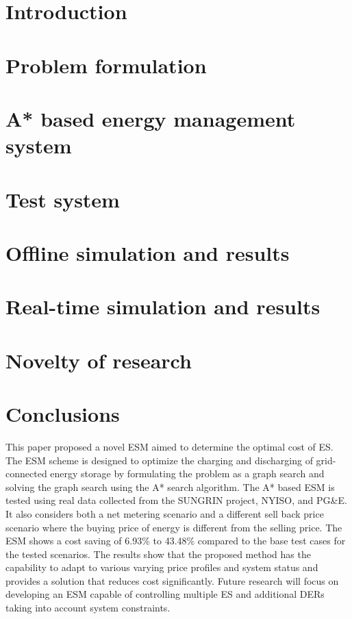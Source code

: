 \documentclass[journal]{IEEEtran}
\begin{document}
\IEEEpeerreviewmaketitle


\section{Introduction}


\section{Problem formulation} \label{formulation}


\section{A* based energy management system} \label{A*}


\section{Test system} \label{sys}


\section{Offline simulation and results} \label{OFF}


\section{Real-time simulation and results} \label{RT}


\section{Novelty of research} \label{Novelty}


\section{Conclusions}
This paper proposed a novel ESM aimed to determine the optimal cost of ES. The ESM scheme is designed to optimize the charging and discharging of grid-connected energy storage by formulating the problem as a graph search and solving the graph search using the A* search algorithm. The A* based ESM is tested using real data collected from the SUNGRIN project, NYISO, and PG\&E. It also considers both a net metering scenario and a different sell back price scenario where the buying price of energy is different from the selling price. The ESM shows a cost saving of 6.93\% to 43.48\% compared to the base test cases for the tested scenarios. The results show that the proposed method has the capability to adapt to various varying price profiles and system status and provides a solution that reduces cost significantly. Future research will focus on developing an ESM capable of controlling multiple ES and additional DERs taking into account system constraints.




\ifCLASSOPTIONcaptionsoff
  \newpage
\fi
\end{document}
